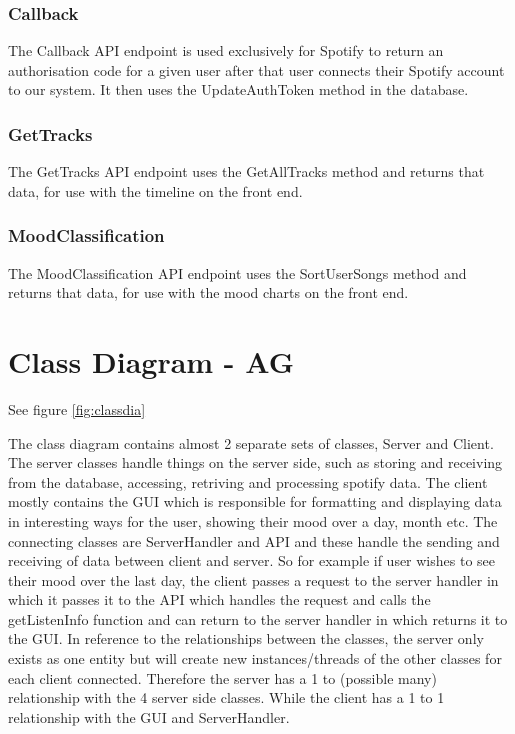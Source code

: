 \documentclass[10pt]{report}
\begin{document}
\subsubsection{Callback}
The Callback API endpoint is used exclusively for Spotify to return an authorisation code for a given user after that user connects their Spotify account to our system. It then uses the UpdateAuthToken method in the database.

\subsubsection{GetTracks}
The GetTracks API endpoint uses the GetAllTracks method and returns that data, for use with the timeline on the front end.

\subsubsection{MoodClassification}
The MoodClassification API endpoint uses the SortUserSongs method and returns that data, for use with the mood charts on the front end.

\section{Class Diagram - AG}

See figure \ref{fig:classdia}

The class diagram contains almost 2 separate sets of classes, Server and Client. The server classes handle things on the server side, such as storing and receiving from the database, accessing, retriving and processing spotify data. The client mostly contains the GUI which is responsible for formatting and displaying data in interesting ways for the user, showing their mood over a day, month etc. The connecting classes are ServerHandler and API and these handle the sending and receiving of data between client and server. So for example if user wishes to see their mood over the last day, the client passes a request to the server handler in which it passes it to the API which handles the request and calls the getListenInfo function and can return to the server handler in which returns it to the GUI. In reference to the relationships between the classes, the server only exists as one entity but will create new instances/threads of the other classes for each client connected. Therefore the server has a 1 to (possible many) relationship with the 4 server side classes. While the client has a 1 to 1 relationship with the GUI and ServerHandler.
\end{document}
